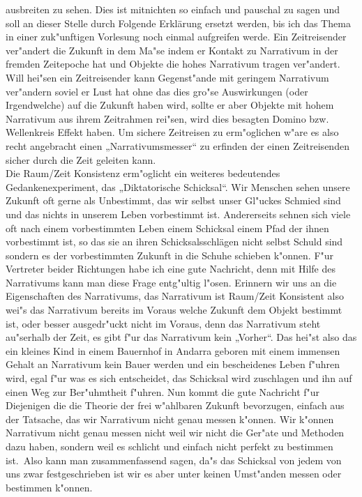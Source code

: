 \documentclass[a5paper,8pt]{book}
\begin{document}
ausbreiten zu sehen. Dies ist mitnichten so einfach und pauschal zu sagen und soll an dieser Stelle durch Folgende Erklärung ersetzt werden, 
bis ich das Thema in einer zuk"unftigen Vorlesung noch einmal aufgreifen werde. Ein Zeitreisender ver"andert die Zukunft in dem Ma"se indem 
er Kontakt zu Narrativum in der fremden Zeitepoche hat 
und Objekte die hohes Narrativum tragen ver"andert. Will hei"sen ein Zeitreisender kann Gegenst"ande mit geringem Narrativum ver"andern soviel 
er Lust hat ohne das dies gro"se Auswirkungen (oder Irgendwelche) auf die Zukunft haben wird, sollte er aber Objekte mit hohem Narrativum aus 
ihrem Zeitrahmen rei"sen, wird dies besagten Domino bzw. Wellenkreis Effekt haben. Um sichere Zeitreisen zu erm"oglichen w"are es also recht 
angebracht einen „Narrativumsmesser“ zu erfinden der einen Zeitreisenden sicher durch die Zeit geleiten kann.\\

Die Raum/Zeit Konsistenz erm"oglicht ein weiteres bedeutendes Gedankenexperiment, das „Diktatorische Schicksal“. Wir Menschen sehen unsere 
Zukunft oft gerne als Unbestimmt, das wir selbst unser Gl"uckes Schmied sind und das nichts in unserem Leben vorbestimmt ist. Andererseits 
sehnen sich viele oft nach einem vorbestimmten Leben einem Schicksal einem Pfad der ihnen vorbestimmt ist, so das sie an ihren Schicksalsschlägen 
nicht selbst Schuld sind sondern es der vorbestimmten Zukunft in die Schuhe schieben k"onnen.
F"ur Vertreter beider Richtungen habe ich eine gute Nachricht, denn mit Hilfe des Narrativums kann man diese Frage entg"ultig l"osen.
Erinnern wir uns an die Eigenschaften des Narrativums, das Narrativum ist Raum/Zeit Konsistent also wei"s das Narrativum bereits im Voraus welche 
Zukunft dem Objekt bestimmt ist, oder besser ausgedr"uckt nicht im Voraus, denn das Narrativum steht au"serhalb der Zeit, es gibt f"ur das 
Narrativum kein „Vorher“. Das hei"st also das ein kleines Kind in einem Bauernhof in Andarra geboren mit einem immensen Gehalt an Narrativum 
kein Bauer werden und ein bescheidenes Leben f"uhren wird, egal f"ur was es sich entscheidet, das Schicksal wird zuschlagen und ihn auf einen 
Weg zur Ber"uhmtheit f"uhren.
Nun kommt die gute Nachricht f"ur Diejenigen die die Theorie der frei w"ahlbaren Zukunft bevorzugen, einfach aus der Tatsache, das wir Narrativum 
nicht genau messen k"onnen. Wir k"onnen Narrativum nicht genau messen nicht weil wir nicht die Ger"ate und Methoden dazu haben, sondern weil es 
schlicht und einfach nicht perfekt zu bestimmen ist.\
Also kann man zusammenfassend sagen, da"s das Schicksal von jedem von uns zwar festgeschrieben ist wir es aber unter keinen Umst"anden messen 
oder bestimmen k"onnen.\\
\end{document}
